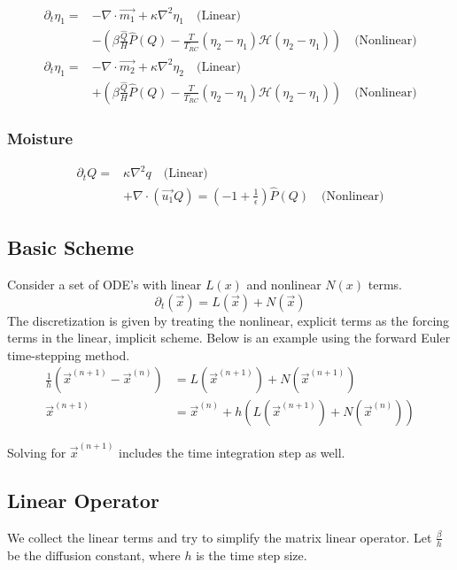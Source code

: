 \documentclass[10pt]{article}
\newcommand{\pd}[1]{\partial_{#1}}
\newcommand{\HH}{\mathcal{H}}
\begin{document}
\begin{align*}
\pd{t}\eta_1 =& -\nabla \cdot\vec{m_1} + \kappa \nabla ^2 \eta_1  \quad\text{(Linear)} \\ &-\left(\beta\frac{\hat{Q}}{H}\hat{P}(Q)-\frac{T}{T_{RC}}(\eta_2-\eta_1)\HH(\eta_2-\eta_1)\right)\quad\text{(Nonlinear)}
\end{align*}
\begin{align*}
\pd{t}\eta_1 =& -\nabla \cdot\vec{m_2} + \kappa \nabla ^2 \eta_2  \quad\text{(Linear)} \\ &+\left(\beta\frac{\hat{Q}}{H}\hat{P}(Q)-\frac{T}{T_{RC}}(\eta_2-\eta_1)\HH(\eta_2-\eta_1)\right)\quad\text{(Nonlinear)}
\end{align*}

\subsubsection*{Moisture}
\begin{align*}
\pd{t} Q =& \kappa \nabla ^2 q \quad\text{(Linear)}\\
& + \nabla \cdot (\vec{u_1}Q) = \left(-1+\frac{1}{\epsilon}\right) \hat{P}(Q) \quad\text{(Nonlinear)}
\end{align*}

\subsection{Basic Scheme}
Consider a set of ODE's with linear $L(x)$  and nonlinear $N(x)$ terms.
\begin{equation}
\pd{t}(
\vec{x}) = L(\vec{x})+N(\vec{x}) 
\end{equation}
The discretization is given by treating the nonlinear, explicit terms as the forcing terms in the linear, implicit scheme. Below is an example using the forward Euler time-stepping method. 
\begin{align*}
\frac{1}{h}\left(\vec{x}^{(n+1)}-\vec{x}^{(n)}\right) &= L(\vec{x}^{(n+1)}) + N(\vec{x}^{(n+1)}) \\
\vec{x}^{(n+1)} &= \vec{x}^{(n)}+h\left(L(\vec{x}^{(n+1)}) + N(\vec{x}^{(n)}) \right)
\end{align*}

Solving for $\vec{x}^{(n+1)}$ includes the time integration step as well. 

\subsection{Linear Operator}
We collect the linear terms and try to simplify the matrix linear operator. 
Let $\frac{\beta}{h}$ be the diffusion constant, where $h$ is the time step size. 
\end{document}
